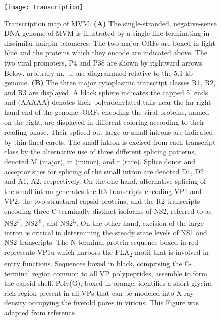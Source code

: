\begin{figure}[H]
\vspace{1.5cm}
\centering
  \texttt{[image: Transcription]}\\[0.3cm]
  \caption[Transcription Map of MVM]
   {Transcription map of MVM. \textbf{(A)} The single-stranded, negative-sense DNA genome of MVM is illustrated by a single line terminating in dissimilar hairpin telomeres. The two major ORFs are boxed in light blue and the proteins which they encode are indicated above. The two viral promoters, P4 and P38 are shown by rightward arrows. Below, arbitrary m.~u. are diagrammed relative to the 5.1 kb genome. \textbf{(B)} The three major cytoplasmic transcript classes R1, R2, and R3 are displayed. A black sphere indicates the capped 5’ ends and (AAAAA) denotes their polyadenylated tails near the far right-hand end of the genome. ORFs encoding the viral proteins, named on the right, are displayed in different coloring according to their reading phase. Their spliced-out large or small introns are indicated by thin-lined carets. The small intron is excised from each transcript class by the alternative use of three different splicing patterns, denoted M (major), m (minor), and r (rare). Splice donor and acceptor sites for splicing of the small intron are denoted D1, D2 and A1, A2, respectively. On the one hand, alternative splicing of the small intron generates the R3 transcripts encoding VP1 and VP2, the two structural capsid proteins, and the R2 transcripts encoding three C-terminally distinct isoforms of NS2, referred to as NS2\textsuperscript{P}, NS2\textsuperscript{Y}, and NS2\textsuperscript{L}. On the other hand, excision of the large intron is critical in determining the steady state levels of NS1 and NS2 transcripts. The N-terminal protein sequence boxed in red represents VP1u which harbors the PLA\textsubscript{2} motif that is involved in entry functions. Sequences boxed in black, comprising the C-terminal region common to all VP polypeptides, assemble to form the capsid shell. Poly(G), boxed in orange, identifies a short glycine-rich region present in all VPs that can be modeled into X-ray density occupying the fivefold pores in virions. This Figure was adapted from reference~\cite{small}}
\label{Transcription}
\end{figure}       
\clearpage

